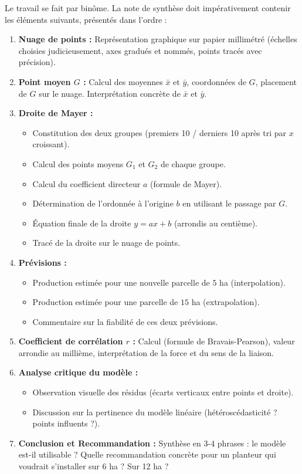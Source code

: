 \documentclass[11pt]{article}
\newcounter{popsec}
\newcounter{popsub}
\newcommand{\courssub}[1]{%
  \stepcounter{popsub}%
  \par\vspace{9pt}\noindent{\popxbold\fontsize{11.5}{13}\selectfont\color{popink}{\color{poporange}\thepopsec.\thepopsub}\hspace{6pt}#1}\par\nopagebreak\vspace{4pt}
}
\begin{document}
\courssub{Consignes}
Le travail se fait par binôme. La note de synthèse doit impérativement contenir les éléments suivants, présentés dans l'ordre :
\begin{enumerate}
    \item \textbf{Nuage de points :} Représentation graphique sur papier millimétré (échelles choisies judicieusement, axes gradués et nommés, points tracés avec précision).
    \item \textbf{Point moyen $G$ :} Calcul des moyennes $\bar{x}$ et $\bar{y}$, coordonnées de $G$, placement de $G$ sur le nuage. Interprétation concrète de $\bar{x}$ et $\bar{y}$.
    \item \textbf{Droite de Mayer :} 
    \begin{itemize}
        \item Constitution des deux groupes (premiers 10 / derniers 10 après tri par $x$ croissant).
        \item Calcul des points moyens $G_1$ et $G_2$ de chaque groupe.
        \item Calcul du coefficient directeur $a$ (formule de Mayer).
        \item Détermination de l'ordonnée à l'origine $b$ en utilisant le passage par $G$.
        \item Équation finale de la droite $y = ax + b$ (arrondis au centième).
        \item Tracé de la droite sur le nuage de points.
    \end{itemize}
    \item \textbf{Prévisions :} 
    \begin{itemize}
        \item Production estimée pour une nouvelle parcelle de $5$ ha (interpolation).
        \item Production estimée pour une parcelle de $15$ ha (extrapolation).
        \item Commentaire sur la fiabilité de ces deux prévisions.
    \end{itemize}
    \item \textbf{Coefficient de corrélation $r$ :} Calcul (formule de Bravais-Pearson), valeur arrondie au millième, interprétation de la force et du sens de la liaison.
    \item \textbf{Analyse critique du modèle :} 
    \begin{itemize}
        \item Observation visuelle des résidus (écarts verticaux entre points et droite).
        \item Discussion sur la pertinence du modèle linéaire (hétéroscédasticité ? points influents ?).
    \end{itemize}
    \item \textbf{Conclusion et Recommandation :} Synthèse en 3-4 phrases : le modèle est-il utilisable ? Quelle recommandation concrète pour un planteur qui voudrait s'installer sur 6 ha ? Sur 12 ha ?
\end{enumerate}
\end{document}
